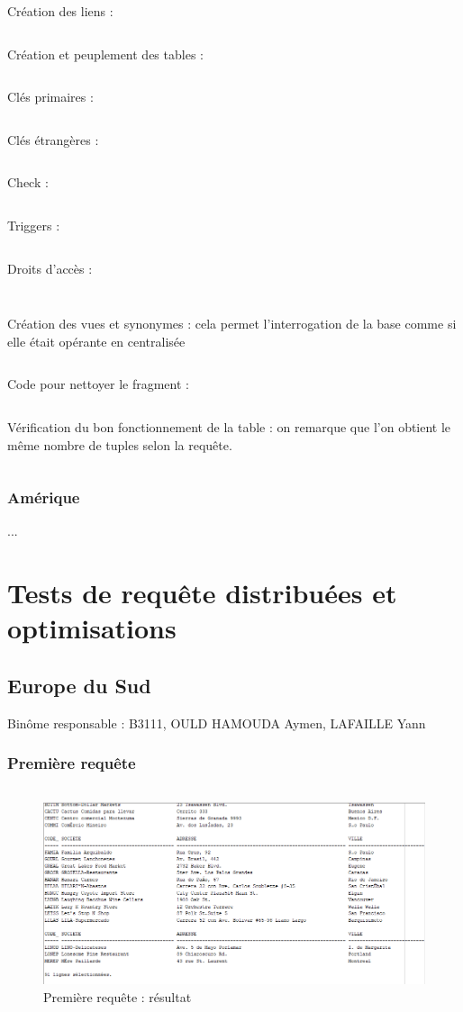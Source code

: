 \documentclass[10pt,a4paper]{article}
\theoremstyle{plain}
\begin{document}
Création des liens :
\inputminted{sql}{EUS_III-C-2-creation_liens.sql}
\newpage

Création et peuplement des tables :
\inputminted{sql}{EUS_III-C-3-creation_tables.sql}
\newpage

Clés primaires : 
\inputminted{sql}{EUS_III-C-5-Primary_key.sql}
\newpage

Clés étrangères :
\inputminted{sql}{EUS_III-C-5_foreign_key.sql}
\newpage

Check :
\inputminted{sql}{EUS_III-C-5_check.sql}
\newpage

Triggers : 
\inputminted{sql}{EUS_III-C-5_trigger.sql}
\newpage

Droits d'accès : 
\inputminted{sql}{EUS_III-C-6.sql}
\inputminted{sql}{EUS_III-C-6_2.sql}
\newpage

Création des vues et synonymes : cela permet l'interrogation de la base comme si elle était opérante en centralisée

\inputminted{sql}{EUS_III-C-7.sql}
\newpage

Code pour nettoyer le fragment :
\inputminted{sql}{EUS_III-C-8.sql}
\newpage

Vérification du bon fonctionnement de la table : on remarque que l'on obtient le même nombre de tuples selon la requête.
\inputminted{sql}{EUS_III-C-9.sql}
\newpage 

\subsubsection{Amérique}
...
\newpage

\section{Tests de requête distribuées et optimisations}
\subsection{Europe du Sud}
Binôme responsable : B3111, OULD HAMOUDA Aymen, LAFAILLE Yann

\subsubsection{Première requête}
\inputminted{sql}{EUS_IV-A-1.sql}
\begin{figure}[!h]
    \centering
    \includegraphics[width=15cm]{EUS_req1.PNG}
    \caption{Première requête : résultat}
\end{figure}
\end{document}
